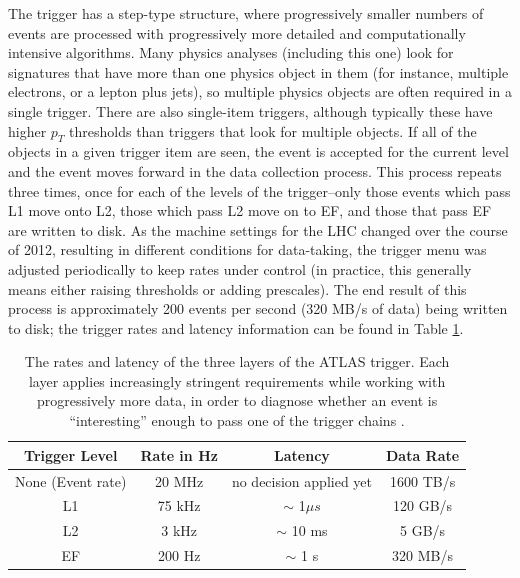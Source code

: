 The trigger has a step-type structure, where progressively smaller numbers of events are processed with progressively more 
detailed and computationally intensive algorithms.  
Many physics analyses (including this one) look for signatures that have more than one physics object in 
them (for instance, multiple electrons, or a lepton plus jets), so multiple physics objects are often 
required in a single trigger.  There are also single-item triggers, although typically these have higher $p_T$ thresholds 
than triggers that look for multiple objects.  If all of the objects in a given trigger item are seen, 
the event is accepted for the current level and the event moves forward in the data collection process.  
This process repeats three times, once for each of the levels of the trigger--only those events which 
pass L1 move onto L2, those which pass L2 move on to EF, and those that pass EF 
are written to disk.  As the machine settings for the LHC changed over the course of 2012, resulting 
in different conditions for data-taking, the trigger menu was adjusted periodically to keep rates under control (in 
practice, this generally means either raising thresholds or adding prescales).  
The end result of this process is approximately 200 events 
per second (320 MB/s of data) being written to disk; the trigger rates and latency 
information can be found in Table \ref{tab:trigger_stats}.

  

\begin{table}
\begin{tabular}{c | c | c | c}
Trigger Level & Rate in Hz  & Latency  & Data Rate\\  \hline
None (Event rate) & 20 MHz  & no decision applied yet & 1600 TB/s \\
L1  & 75 kHz  &  $\sim$ 1$\mu s$  & 120 GB/s\\
L2  & 3 kHz    & $\sim$ 10 ms & 5 GB/s \\
EF  &  200 Hz  & $\sim$ 1 s & 320 MB/s \\
\end{tabular}
\caption{The rates and latency of the three layers of the ATLAS trigger.  Each layer applies increasingly stringent requirements
while working with progressively more data, in order to diagnose whether an event is ``interesting'' enough to pass
one of the trigger chains \cite{atlas_trigger}. \label{tab:trigger_stats}}
\end{table}


